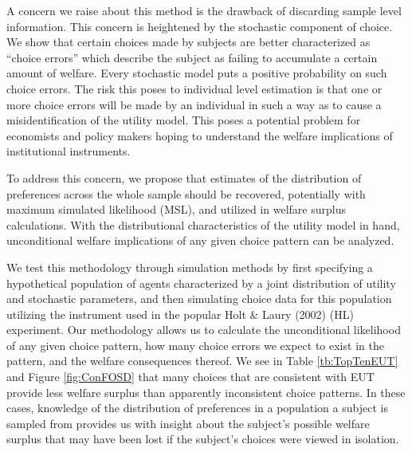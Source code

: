 \documentclass[../main.tex]{subfiles}
\begin{document}
A concern we raise about this method is the drawback of discarding sample level information.
This concern is heightened by the stochastic component of choice.
We show that certain choices made by subjects are better characterized as \enquote{choice errors} which describe the subject as failing to accumulate a certain amount of welfare.
Every stochastic model puts a positive probability on such choice errors.
The risk this poses to individual level estimation is that one or more choice errors will be made by an individual in such a way as to cause a misidentification of the utility model.
This poses a potential problem for economists and policy makers hoping to understand the welfare implications of institutional instruments.

To address this concern, we propose that estimates of the distribution of preferences across the whole sample should be recovered, potentially with maximum simulated likelihood (MSL), and utilized in welfare surplus calculations.
With the distributional characteristics of the utility model in hand, unconditional welfare implications of any given choice pattern can be analyzed.

We test this methodology through simulation methods by first specifying a hypothetical population of agents characterized by a joint distribution of utility and stochastic parameters, and then simulating choice data for this population utilizing the instrument used in the popular Holt \& Laury (2002) (HL) experiment.
Our methodology allows us to calculate the unconditional likelihood of any given choice pattern, how many choice errors we expect to exist in the pattern, and the welfare consequences thereof.
We see in Table \ref{tb:TopTenEUT} and Figure \ref{fig:ConFOSD} that many choices that are consistent with EUT provide less welfare surplus than apparently inconsistent choice patterns.
In these cases, knowledge of the distribution of preferences in a population a subject is sampled from provides us with insight about the subject's possible welfare surplus that may have been lost if the subject's choices were viewed in isolation.

\end{document}
